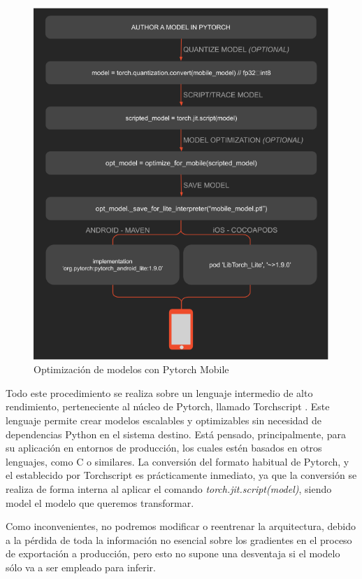 \begin{figure}[H]
	\centering
	\includegraphics[scale = 0.5]{imagenes/pytorch-mobile.png}
	\caption{Optimización de modelos con Pytorch Mobile \cite{pmobile}}
	\label {fig:mobileprocess}
\end{figure}

Todo este procedimiento se realiza sobre un lenguaje intermedio de alto rendimiento, perteneciente al núcleo de Pytorch, llamado Torchscript \cite{torchscript}. Este lenguaje permite crear modelos escalables y optimizables sin necesidad de dependencias Python en el sistema destino. Está pensado, principalmente, para su aplicación en entornos de producción, los cuales estén basados en otros lenguajes, como C o similares. La conversión del formato habitual de Pytorch, y el establecido por Torchscript es prácticamente inmediato, ya que la conversión se realiza de forma interna al aplicar el comando \textit{torch.jit.script(model)}, siendo model el modelo que queremos transformar.

Como inconvenientes, no podremos modificar o reentrenar la arquitectura, debido a la pérdida de toda la información no esencial sobre los gradientes en el proceso de exportación a producción, pero esto no supone una desventaja si el modelo sólo va a ser empleado para inferir.

